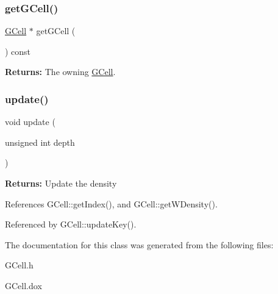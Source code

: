 \subsubsection{\texorpdfstring{get\+G\+Cell()}{getGCell()}}
{\footnotesize\ttfamily \hyperlink{classKatabatic_1_1GCell}{G\+Cell} $\ast$ get\+G\+Cell (\begin{DoxyParamCaption}{ }\end{DoxyParamCaption}) const\hspace{0.3cm}{\ttfamily [inline]}}

{\bfseries Returns\+:} The owning \hyperlink{classKatabatic_1_1GCell}{G\+Cell}. \mbox{\label{classKatabatic_1_1GCell_1_1Key_a1b9cfb06a645d2b0d93024bc6ff82e9e}} 
\subsubsection{\texorpdfstring{update()}{update()}}
{\footnotesize\ttfamily void update (\begin{DoxyParamCaption}\item[{unsigned int}]{depth }\end{DoxyParamCaption})\hspace{0.3cm}{\ttfamily [inline]}}

{\bfseries Returns\+:} Update the density 

References G\+Cell\+::get\+Index(), and G\+Cell\+::get\+W\+Density().



Referenced by G\+Cell\+::update\+Key().



The documentation for this class was generated from the following files\+:\begin{DoxyCompactItemize}
\item 
G\+Cell.\+h\item 
G\+Cell.\+dox\end{DoxyCompactItemize}
